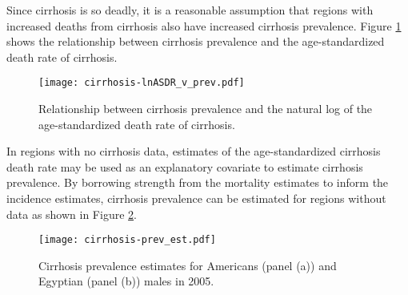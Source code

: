 Since cirrhosis is so deadly, it is a reasonable assumption that regions with increased deaths from cirrhosis also have increased cirrhosis prevalence.  Figure \ref{fig:app-cirrhosis asp} shows the relationship between cirrhosis prevalence and the age-standardized death rate of cirrhosis.

    \begin{figure}[h]
        \begin{center}
            \texttt{[image: cirrhosis-lnASDR\_v\_prev.pdf]}
            \caption{Relationship between cirrhosis prevalence and the natural log of the age-standardized death rate of cirrhosis.}
            \label{fig:app-cirrhosis asp}
        \end{center}
    \end{figure}

In regions with no cirrhosis data, estimates of the age-standardized cirrhosis death rate may be used as an explanatory covariate to estimate cirrhosis prevalence.  By borrowing strength from the mortality estimates to inform the incidence estimates, cirrhosis prevalence can be estimated for regions without data as shown in Figure \ref{fig:app-cirrhosis prev est}.

    \begin{figure}[h]
        \begin{center}
            \texttt{[image: cirrhosis-prev\_est.pdf]}
            \caption{Cirrhosis prevalence estimates for Americans (panel (a)) and Egyptian (panel (b)) males in 2005.}
            \label{fig:app-cirrhosis prev est}
        \end{center}
    \end{figure}
